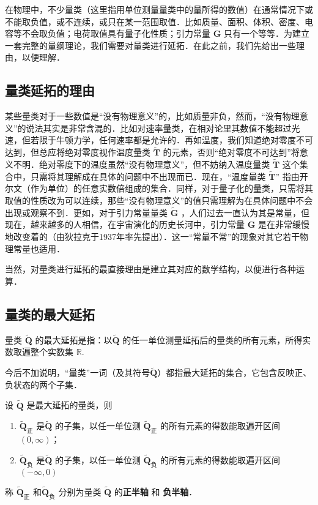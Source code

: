 
\begin{issues}
\issueTODO
\end{issues}

在物理中，不少量类（这里指用单位测量量类中的量所得的数值）在通常情况下或不能取负值，或不连续，或只在某一范围取值．比如质量、面积、体积、密度、电容等不会取负值；电荷取值具有量子化性质；引力常量 $\boldsymbol{G}$ 只有一个等等．为建立一套完整的量纲理论，我们需要对量类进行延拓．在此之前，我们先给出一些理由，以便理解．
\subsection{量类延拓的理由}
某些量类对于一些数值是“没有物理意义”的，比如质量非负，然而，“没有物理意义”的说法其实是非常含混的．比如对速率量类，在相对论里其数值不能超过光速，但若限于牛顿力学，任何速率都是允许的．再如温度，我们知道绝对零度不可达到，但总应将绝对零度视作温度量类 $\tilde{\boldsymbol{T}}$ 的元素，否则“绝对零度不可达到”将意义不明．绝对零度下的温度虽然“没有物理意义”，但不妨纳入温度量类 $\tilde{\boldsymbol{T}}$ 这个集合中，只需将其理解成在具体的问题中不出现而已．现在，“温度量类 $\tilde{\boldsymbol{T}}$” 指由开尔文（作为单位）的任意实数倍组成的集合．同样，对于量子化的量类，只需将其取值的性质改为可以连续，那些“没有物理意义”的值只需理解为在具体问题中不会出现或观察不到．更如，对于引力常量量类 $\tilde{\boldsymbol{G}}$ ，人们过去一直认为其是常量，但现在，越来越多的人相信，在宇宙演化的历史长河中，引力常量 $\boldsymbol{G}$ 是在非常缓慢地改变着的（由狄拉克于1937年率先提出）．这一“常量不常”的现象对其它若干物理常量也适用．

当然，对量类进行延拓的最直接理由是建立其对应的数学结构，以便进行各种运算．
\subsection{量类的最大延拓}
\begin{definition}{}
量类 $\tilde{\boldsymbol{Q}}$ 的最大延拓是指：以$\tilde{\boldsymbol{Q}}$ 的任一单位测量延拓后的量类的所有元素，所得实数取遍整个实数集 $\mathbb{R}$.
\end{definition}
今后不加说明，“量类”一词（及其符号$\tilde{\boldsymbol{Q}}$）都指最大延拓的集合，它包含反映正、负状态的两个子集．
\begin{definition}{}
设 $\tilde{\boldsymbol{Q}}$ 是最大延拓的量类，则
\begin{enumerate}
\item $\tilde{\boldsymbol{Q}}_{\text{正}}$ 是$\tilde{\boldsymbol{Q}}$ 的子集，以任一单位测 $\tilde{\boldsymbol{Q}}_{\text{正}}$ 的所有元素的得数能取遍开区间 $(0,\infty)$；
\item $\tilde{\boldsymbol{Q}}_{\text{负}}$ 是$\tilde{\boldsymbol{Q}}$ 的子集，以任一单位测 $\tilde{\boldsymbol{Q}}_{\text{负}}$ 的所有元素的得数能取遍开区间 $(-\infty,0)$
\end{enumerate}
称 $\tilde{\boldsymbol{Q}}_{\text{正}}$ 和$\tilde{\boldsymbol{Q}}_{\text{负}}$ 分别为量类 $\tilde{\boldsymbol{Q}}$ 的\textbf{正半轴} 和 \textbf{负半轴}．
\end{definition}
